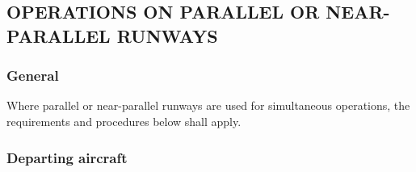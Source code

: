 \documentclass[../main.tex]{subfiles}
\begin{document}
    \subsection[Operations on parallel or near-parallel runways]{OPERATIONS ON PARALLEL OR NEAR-PARALLEL RUNWAYS}

    \subsubsection{General}

    Where parallel or near-parallel runways are used for simultaneous operations, the requirements and procedures below shall apply.


    \subsubsection{Departing aircraft}
\end{document}
